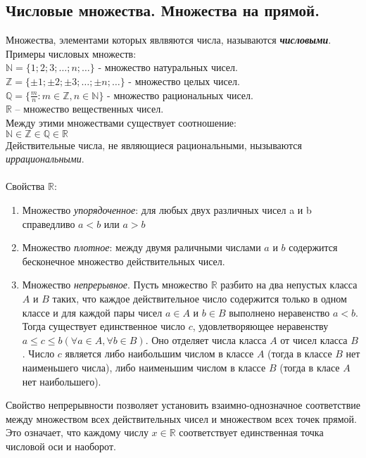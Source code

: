 \documentclass[12pt, fleqn]{article}
\begin{document}
\subsection*{Числовые множества. Множества на прямой.}
Множества, элементами которых явлвяются числа, называются \textbf{\textit{числовыми}}.\\
Примеры числовых множеств: \\
$\mathbb{N} = \{1; 2; 3; \dots ; n; \dots \}$ - множество натуральных чисел.\\
$\mathbb{Z} = \{\pm1; \pm2; \pm3; \dots ; \pm n; \dots \}$ - множество целых чисел.\\
$\mathbb{Q} = \{\frac m n\colon  m \in \mathbb{Z}, n \in \mathbb{N} \}$ - множество рациональных чисел.\\
$\mathbb{R}$ -- множество вещественных чисел.\\
Между этими множествами существует соотношение: \\
$\mathbb{N \in Z \in Q \in R}$\\
Действительные числа, не являющиеся рациональными, нызываются \textit{иррациональными}.\\\\
Свойства $\mathbb{R}$:
\begin{enumerate}
	\item Множество \textit{упорядоченное}:  для любых двух различных чисел a и b справедливо $a < b$ или $a > b$
	\item Множество \textit{плотное}:  между двумя раличными числами $a$ и $b$ содержится бесконечное множество действительных чисел.
	\item Множество \textit{непрерывное}. Пусть множество $\mathbb{R}$ разбито на два непустых класса $A$ и $B$ таких, что каждое действительное число содержится только в одном классе и для каждой пары чисел $a \in A$ и $b \in B$ выполнено неравенство $a<b$. Тогда существует единственное число $c$, удовлетворяющее неравенству $a \leq c \leq b  (\forall a \in A, \forall b \in B)$. Оно отделяет числа класса $A$ от чисел класса $B$. Число $c$ является либо наибольшим числом в классе $A$ (тогда в классе $B$ нет наименьшего числа), либо наименьшим числом в классе $B$ (тогда в класе $A$ нет наибольшего).
\end{enumerate}
Свойство непрерывности позволяет установить взаимно-однозначное соответствие между множеством всех действительных чисел и множеством всех точек прямой. Это означает, что каждому числу $x \in \mathbb{R}$ соответствует единственная точка числовой оси и наоборот.\\\\
\end{document}

